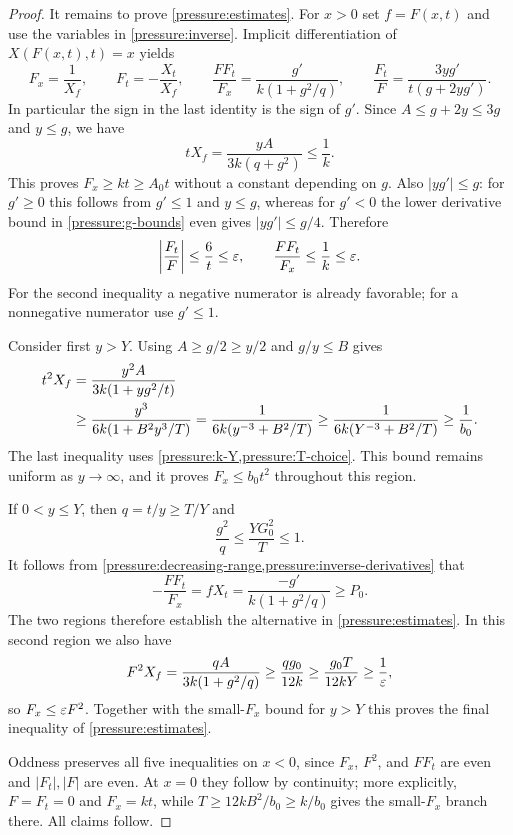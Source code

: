 \begin{proof}
It remains to prove \cref{pressure:estimates}.  For $x>0$ set
$f=F(x,t)$ and use the variables in \cref{pressure:inverse}.  Implicit
differentiation of $X(F(x,t),t)=x$ yields
\begin{equation}\label{pressure:signed-identities}
 F_x=\frac1{X_f},\qquad F_t=-\frac{X_t}{X_f},\qquad
 \frac{FF_t}{F_x}=\frac{g'}{k(1+g^2/q)},\qquad
 \frac{F_t}{F}=\frac{3yg'}{t(g+2yg')}.
\end{equation}
In particular the sign in the last identity is the sign of $g'$.
Since $A\le g+2y\le3g$ and $y\le g$, we have
\begin{equation}\label{pressure:lower-slope}
 tX_f=\frac{yA}{3k(q+g^2)}\le\frac1k.
\end{equation}
This proves $F_x\ge kt\ge A_0t$ without a constant depending on $g$.
Also $|yg'|\le g$: for $g'\ge0$ this follows from $g'\le1$ and
$y\le g$, whereas for $g'<0$ the lower derivative bound in
\cref{pressure:g-bounds} even gives $|yg'|\le g/4$.  Therefore
\[
 \left|\frac{F_t}{F}\right|\le\frac6t\le\varepsilon,
 \qquad
 \frac{FF_t}{F_x}\le\frac1k\le\varepsilon.
\]
For the second inequality a negative numerator is already favorable;
for a nonnegative numerator use $g'\le1$.

Consider first $y>Y$.  Using $A\ge g/2\ge y/2$ and $g/y\le B$ gives
\begin{align}
 t^2X_f
 &=\frac{y^2A}{3k(1+yg^2/t)}\notag\\
 &\ge\frac{y^3}{6k(1+B^2y^3/T)}
  =\frac1{6k(y^{-3}+B^2/T)}
  \ge\frac1{6k(Y^{-3}+B^2/T)}
  \ge\frac1{b_0}.
 \label{pressure:large-y}
\end{align}
The last inequality uses \cref{pressure:k-Y,pressure:T-choice}.
This bound remains uniform as $y\to\infty$, and it proves
$F_x\le b_0t^2$ throughout this region.

If $0<y\le Y$, then $q=t/y\ge T/Y$ and
\[
 \frac{g^2}{q}\le\frac{YG_0^2}{T}\le1.
\]
It follows from \cref{pressure:decreasing-range,pressure:inverse-derivatives}
that
\begin{equation}\label{pressure:favorable-branch}
 -\frac{FF_t}{F_x}=fX_t
   =\frac{-g'}{k(1+g^2/q)}\ge P_0.
\end{equation}
The two regions therefore establish the alternative in
\cref{pressure:estimates}.  In this second region we also have
\begin{equation}\label{pressure:quadratic-upper}
 F^2X_f=\frac{qA}{3k(1+g^2/q)}
   \ge\frac{qg_0}{12k}
   \ge\frac{g_0T}{12kY}\ge\frac1{\varepsilon},
\end{equation}
so $F_x\le\varepsilon F^2$.  Together with the small-$F_x$ bound for $y>Y$
this proves the final inequality of \cref{pressure:estimates}.

Oddness preserves all five inequalities on $x<0$, since $F_x$, $F^2$,
and $FF_t$ are even and $|F_t|,|F|$ are even.  At $x=0$ they follow
by continuity; more explicitly, $F=F_t=0$ and $F_x=kt$, while
$T\ge12kB^2/b_0\ge k/b_0$ gives the small-$F_x$ branch there.
All claims follow.
\end{proof}

